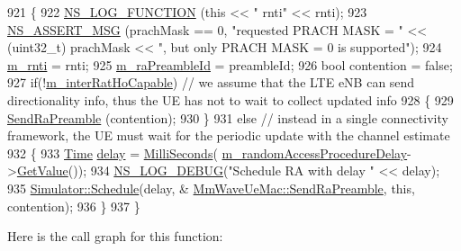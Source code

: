 \begin{DoxyCode}
921 \{
922         \hyperlink{log-macros-disabled_8h_a90b90d5bad1f39cb1b64923ea94c0761}{NS\_LOG\_FUNCTION} (\textcolor{keyword}{this} << \textcolor{stringliteral}{" rnti"} << rnti);
923         \hyperlink{assert_8h_aff5ece9066c74e681e74999856f08539}{NS\_ASSERT\_MSG} (prachMask == 0, \textcolor{stringliteral}{"requested PRACH MASK = "} << (uint32\_t) prachMask << \textcolor{stringliteral}{",
       but only PRACH MASK = 0 is supported"});
924         \hyperlink{classns3_1_1MmWaveUeMac_a73d6bc08e75e3a20c5fbaf3113cf40f5}{m\_rnti} = rnti;
925         \hyperlink{classns3_1_1MmWaveUeMac_a0b48ec5205352aee44ececbeb2c49134}{m\_raPreambleId} = preambleId;
926         \textcolor{keywordtype}{bool} contention = \textcolor{keyword}{false};
927         \textcolor{keywordflow}{if}(!\hyperlink{classns3_1_1MmWaveUeMac_af93fff68b52c041a2d193b18c9c4f5b0}{m\_interRatHoCapable}) \textcolor{comment}{// we assume that the LTE eNB can send directionality
       info, thus the UE has not to wait to collect updated info}
928         \{
929                 \hyperlink{classns3_1_1MmWaveUeMac_ab114a10102da7afa498a865f6ced38e7}{SendRaPreamble} (contention);              
930         \}
931         \textcolor{keywordflow}{else} \textcolor{comment}{// instead in a single connectivity framework, the UE must wait for the periodic update with
       the channel estimate}
932         \{
933                 \hyperlink{namespacens3_1_1TracedValueCallback_a7ffd3e7c142ffe7c8a1d2db9b8de38ec}{Time} \hyperlink{lte_2model_2fading-traces_2fading__trace__generator_8m_a7964e6aa8f61a9d28973c8267a606ad8}{delay} = \hyperlink{group__timecivil_gaf26127cf4571146b83a92ee18679c7a9}{MilliSeconds}(
      \hyperlink{classns3_1_1MmWaveUeMac_a6745a58972cbd101023806bf92b46051}{m\_randomAccessProcedureDelay}->\hyperlink{classns3_1_1UniformRandomVariable_a03822d8c86ac51e9aa83bbc73041386b}{GetValue}());
934                 \hyperlink{group__logging_ga413f1886406d49f59a6a0a89b77b4d0a}{NS\_LOG\_DEBUG}(\textcolor{stringliteral}{"Schedule RA with delay "} << delay);
935                 \hyperlink{classns3_1_1Simulator_a671882c894a08af4a5e91181bf1eec13}{Simulator::Schedule}(delay, &
      \hyperlink{classns3_1_1MmWaveUeMac_ab114a10102da7afa498a865f6ced38e7}{MmWaveUeMac::SendRaPreamble}, \textcolor{keyword}{this}, contention);
936         \}
937 \}
\end{DoxyCode}


Here is the call graph for this function\+:




